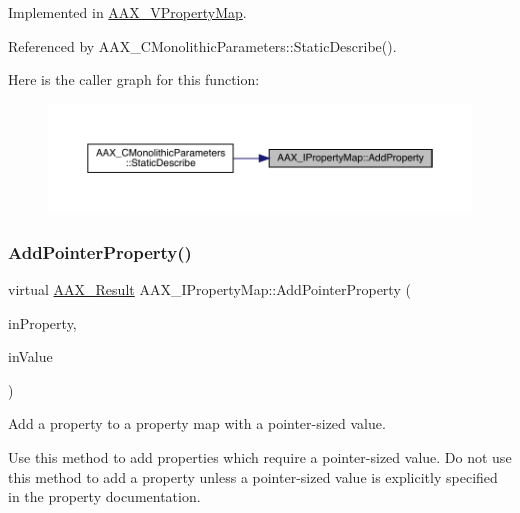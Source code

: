 Implemented in \mbox{\hyperlink{a01937_a33f4492247d093f876a150468c8cdc6d}{A\+A\+X\+\_\+\+V\+Property\+Map}}.



Referenced by A\+A\+X\+\_\+\+C\+Monolithic\+Parameters\+::\+Static\+Describe().

Here is the caller graph for this function\+:
\nopagebreak
\begin{figure}[H]
\begin{center}
\leavevmode
\includegraphics[width=350pt]{a01869_a0997671afce9a2367662c764c1d055dd_icgraph}
\end{center}
\end{figure}
\mbox{\label{a01869_a487f80c33f1c41eff22879b63579c2ef}} 
\subsubsection{\texorpdfstring{AddPointerProperty()}{AddPointerProperty()}\hspace{0.1cm}{\footnotesize\ttfamily [1/2]}}
{\footnotesize\ttfamily virtual \mbox{\hyperlink{a00392_a4d8f69a697df7f70c3a8e9b8ee130d2f}{A\+A\+X\+\_\+\+Result}} A\+A\+X\+\_\+\+I\+Property\+Map\+::\+Add\+Pointer\+Property (\begin{DoxyParamCaption}\item[{\mbox{\hyperlink{a00662_a13e384f22825afd3db6d68395b79ce0d}{A\+A\+X\+\_\+\+E\+Property}}}]{in\+Property,  }\item[{const void $\ast$}]{in\+Value }\end{DoxyParamCaption})\hspace{0.3cm}{\ttfamily [pure virtual]}}



Add a property to a property map with a pointer-\/sized value. 

Use this method to add properties which require a pointer-\/sized value. Do not use this method to add a property unless a pointer-\/sized value is explicitly specified in the property documentation.

